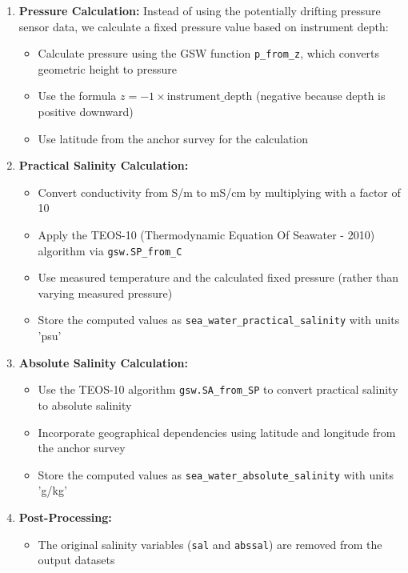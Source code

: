 \documentclass[11pt]{article}
\begin{document}
\begin{enumerate}
    \item \textbf{Pressure Calculation:} Instead of using the potentially drifting pressure sensor data, we calculate a fixed pressure value based on instrument depth:
    \begin{itemize}
        \item Calculate pressure using the GSW function \texttt{p\_from\_z}, which converts geometric height to pressure
        \item Use the formula $z = -1 \times \text{instrument\_depth}$ (negative because depth is positive downward)
        \item Use latitude from the anchor survey for the calculation
    \end{itemize}
    
    \item \textbf{Practical Salinity Calculation:}
    \begin{itemize}
        \item Convert conductivity from S/m to mS/cm by multiplying with a factor of 10
        \item Apply the TEOS-10 (Thermodynamic Equation Of Seawater - 2010) algorithm via \texttt{gsw.SP\_from\_C}
        \item Use measured temperature and the calculated fixed pressure (rather than varying measured pressure)
        \item Store the computed values as \texttt{sea\_water\_practical\_salinity} with units 'psu'
    \end{itemize}
    
    \item \textbf{Absolute Salinity Calculation:}
    \begin{itemize}
        \item Use the TEOS-10 algorithm \texttt{gsw.SA\_from\_SP} to convert practical salinity to absolute salinity
        \item Incorporate geographical dependencies using latitude and longitude from the anchor survey
        \item Store the computed values as \texttt{sea\_water\_absolute\_salinity} with units 'g/kg'
    \end{itemize}
    
    \item \textbf{Post-Processing:}
    \begin{itemize}
        \item The original salinity variables (\texttt{sal} and \texttt{abssal}) are removed from the output datasets
    \end{itemize}
\end{enumerate}
\end{document}
